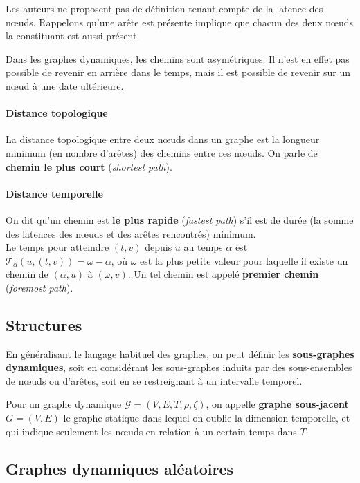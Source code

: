 \documentclass[12pt,a4paper]{article}
\begin{document}
Les auteurs ne proposent pas de définition tenant compte de la latence
des nœuds. Rappelons qu'une arête est présente implique que chacun des
deux nœuds la constituant est aussi présent.

Dans les graphes dynamiques, les chemins sont asymétriques. Il n'est
en effet pas possible de revenir en arrière dans le temps, mais il est
possible de revenir sur un nœud à une date ultérieure.

\paragraph{Distance topologique} La distance topologique entre deux
nœuds dans un graphe est la longueur minimum (en nombre d'arêtes) des
chemins entre ces nœuds. On parle de \textbf{chemin le plus court}
(\textit{shortest path}).

\paragraph{Distance temporelle}
On dit qu'un chemin est \textbf{le plus rapide} (\textit{fastest
  path}) s'il est de durée (la somme des latences des nœuds et des
arêtes rencontrés) minimum.\\
Le temps pour atteindre \((t, v)\) depuis \(u\) au temps \(\alpha\)
est \(\mathcal{T}_{\alpha}(u, (t, v)) = \omega - \alpha\), où
\(\omega\) est la plus petite valeur pour laquelle il existe un chemin
de \((\alpha, u)\) à \((\omega, v)\). Un tel chemin est appelé
\textbf{premier chemin} (\textit{foremost path}).

\subsection{Structures}

En généralisant le langage habituel des graphes, on peut définir les
\textbf{sous-graphes dynamiques}, soit en considérant les sous-graphes
induits par des sous-ensembles de nœuds ou d'arêtes, soit en se
restreignant à un intervalle temporel.

Pour un graphe dynamique \(\mathcal{G} = (V, E, T, \rho, \zeta)\), on
appelle \textbf{graphe sous-jacent} \(G = (V, E)\) le graphe statique
dans lequel on oublie la dimension temporelle, et qui indique
seulement les nœuds en relation à un certain temps dans \(T\).

\subsection{Graphes dynamiques aléatoires}
\end{document}
